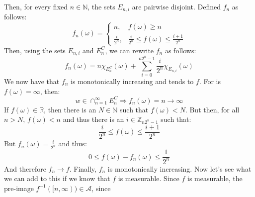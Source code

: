                 Then, for every fixed $n\in\mathbb{N}$, the sets
                $E_{n,i}$ are pairwise disjoint. Defined $f_{n}$ as
                follows:
                \begin{equation}
                    f_{n}(\omega)=
                    \begin{cases}
                        n,&f(\omega)\geq{n}\\
                        \frac{i}{2^{n}},&\frac{i}{2^{n}}
                            \leq{f}(\omega)
                            \leq\frac{i+1}{2^{n}}
                    \end{cases}
                \end{equation}
                Then, using the sets $E_{n,i}$ and $E_{n}^{C}$, we
                can rewrite $f_{n}$ as follows:
                \begin{equation}
                    f_{n}(\omega)=
                    n\chi_{E_{n}^{C}}(\omega)+
                    \sum_{i=0}^{n2^{n}-1}
                        \frac{i}{2^{n}}\chi_{E_{n,i}}(\omega)
                \end{equation}
                We now have that $f_{n}$ is monotonically increasing
                and tends to $f$. For is $f(\omega)=\infty$, then:
                \begin{equation}
                    w\in\cap_{n=1}^{\infty}E_{n}^{C}
                    \Rightarrow
                    f_{n}(\omega)=n\rightarrow\infty
                \end{equation}
                If $f(\omega)\in\mathbb{R}$, then there is an
                $N\in\mathbb{N}$ such that $f(\omega)<N$. But then, for
                all $n>N$, $f(\omega)<n$ and thus there is an
                $i\in\mathbb{Z}_{n2^{n}-1}$ such that:
                \begin{equation}
                    \frac{i}{2^{n}}\leq{f}(\omega)\leq\frac{i+1}{2^{n}}
                \end{equation}
                But $f_{n}(\omega)=\frac{i}{2^{n}}$ and thus:
                \begin{equation}
                    0\leq{f}(\omega)-f_{n}(\omega)\leq\frac{1}{2^{n}}
                \end{equation}
                And therefore $f_{n}\rightarrow{f}$. Finally,
                $f_{n}$ is monotonically increasing. Now let's see what
                we can add to this if we know that $f$ is measurable.
                Since $f$ is measurable, the pre-image
                $f^{-1}([n,\infty))\in\mathcal{A}$, since

